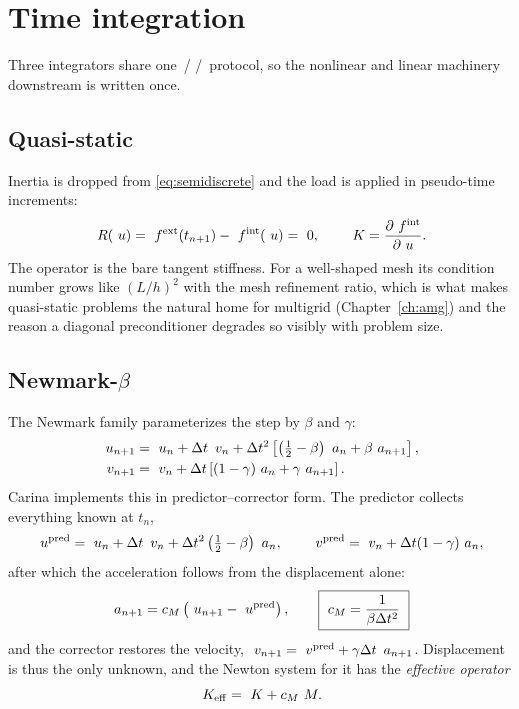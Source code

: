 \chapter{Time integration}
\label{ch:integration}

Three integrators share one \,/\,\,/\,%
 protocol, so the nonlinear and linear machinery downstream is
written once.

\section{Quasi-static}
\label{sec:quasistatic}

Inertia is dropped from \eqref{eq:semidiscrete} and the load is applied in
pseudo-time increments:
\begin{equation}
  ~R(~u) = ~f^{\mathrm{ext}}(t_{n+1}) - ~f^{\mathrm{int}}(~u) = ~0,
  \qquad ~K = \frac{\partial~f^{\mathrm{int}}}{\partial~u} .
\end{equation}
The operator is the bare tangent stiffness.  For a well-shaped mesh its
condition number grows like $(L/h)^2$ with the mesh refinement ratio, which is
what makes quasi-static problems the natural home for multigrid
(Chapter~\ref{ch:amg}) and the reason a diagonal preconditioner degrades so
visibly with problem size.

\section{Newmark-\texorpdfstring{$\beta$}{beta}}
\label{sec:newmark}

The Newmark family parameterizes the step by $\beta$ and $\gamma$:
\begin{align}
  ~u_{n+1} &= ~u_n + \Delta t\, ~v_n
                + \Delta t^2\left[\left(\tfrac12 - \beta\right)~a_n + \beta ~a_{n+1}\right], \\
  ~v_{n+1} &= ~v_n + \Delta t\left[(1-\gamma)~a_n + \gamma ~a_{n+1}\right].
\end{align}
Carina implements this in predictor--corrector form.  The predictor collects
everything known at $t_n$,
\begin{equation}
  ~u^{\mathrm{pred}} = ~u_n + \Delta t\, ~v_n
                          + \Delta t^2\left(\tfrac12 - \beta\right)~a_n,
  \qquad
  ~v^{\mathrm{pred}} = ~v_n + \Delta t (1-\gamma)~a_n,
\end{equation}
after which the acceleration follows from the displacement alone:
\begin{equation}
  ~a_{n+1} = c_M\left(~u_{n+1} - ~u^{\mathrm{pred}}\right),
  \qquad
  \boxed{\ c_M = \frac{1}{\beta \Delta t^2}\ }
  \label{eq:cM}
\end{equation}
and the corrector restores the velocity, $~v_{n+1} = ~v^{\mathrm{pred}} +
\gamma\Delta t\,~a_{n+1}$.  Displacement is thus the only unknown, and the
Newton system for it has the \emph{effective operator}
\begin{equation}
  ~K_{\mathrm{eff}} = ~K + c_M ~M .
  \label{eq:keff}
\end{equation}

